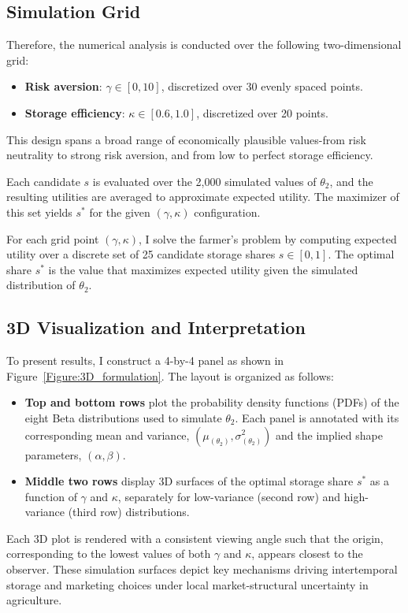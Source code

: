 \subsection{Simulation Grid}
\noindent Therefore, the numerical analysis is conducted over the following two-dimensional grid:
\begin{itemize}
\item \textbf{Risk aversion}: $\gamma \in [0, 10]$, discretized over 30 evenly spaced points.
\item \textbf{Storage efficiency}: $\kappa \in [0.6, 1.0]$, discretized over 20 points.
\end{itemize}

This design spans a broad range of economically plausible values-from risk neutrality to strong risk aversion, and from low to perfect storage efficiency.

Each candidate $s$ is evaluated over the 2,000 simulated values of $\theta_2$, and the resulting utilities are averaged to approximate expected utility. The maximizer of this set yields $s^*$ for the given $(\gamma, \kappa)$ configuration.

For each grid point $(\gamma, \kappa)$, I solve the farmer's problem by computing expected utility over a discrete set of 25 candidate storage shares $s \in [0, 1]$. The optimal share $s^*$ is the value that maximizes expected utility given the simulated distribution of $\theta_2$.



\subsection{3D Visualization and Interpretation}
\noindent To present results, I construct a 4-by-4 panel as shown in Figure~\ref{Figure:3D_formulation}. The layout is organized as follows:
\begin{itemize}
\item \textbf{Top and bottom rows} plot the probability density functions (PDFs) of the eight Beta distributions used to simulate $\theta_2$. Each panel is annotated with its corresponding mean and variance, $(\mu_{(\theta_2)}, \sigma^2_{(\theta_2)})$ and the implied shape parameters,  $(\alpha, \beta)$.
\item \textbf{Middle two rows} display 3D surfaces of the optimal storage share $s^*$ as a function of $\gamma$ and $\kappa$, separately for low-variance (second row) and high-variance (third row) distributions.
\end{itemize}
Each 3D plot is rendered with a consistent viewing angle such that the origin, corresponding to the lowest values of both $\gamma$ and $\kappa$, appears closest to the observer. These simulation surfaces depict key mechanisms driving intertemporal storage and marketing choices under local market-structural uncertainty in agriculture.

